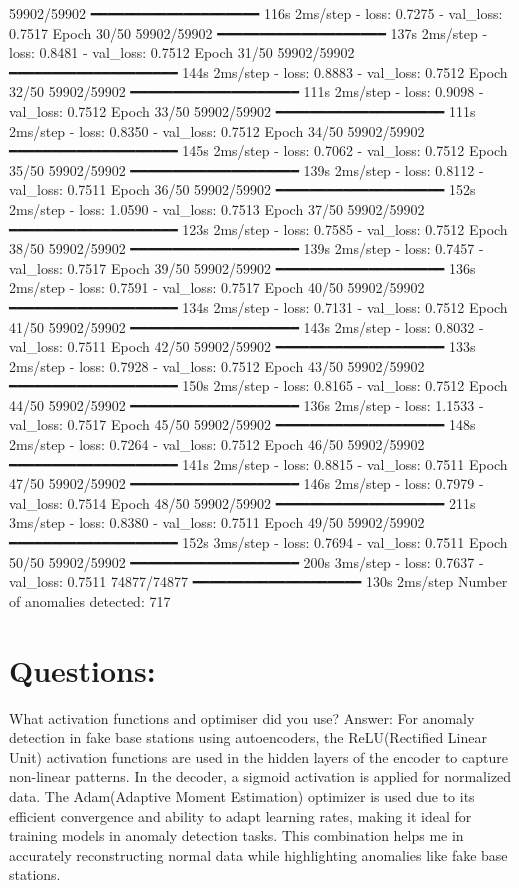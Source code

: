 59902/59902 ━━━━━━━━━━━━━━━━━━━━ 116s 2ms/step - loss: 0.7275 - val_loss: 0.7517
Epoch 30/50
59902/59902 ━━━━━━━━━━━━━━━━━━━━ 137s 2ms/step - loss: 0.8481 - val_loss: 0.7512
Epoch 31/50
59902/59902 ━━━━━━━━━━━━━━━━━━━━ 144s 2ms/step - loss: 0.8883 - val_loss: 0.7512
Epoch 32/50
59902/59902 ━━━━━━━━━━━━━━━━━━━━ 111s 2ms/step - loss: 0.9098 - val_loss: 0.7512
Epoch 33/50
59902/59902 ━━━━━━━━━━━━━━━━━━━━ 111s 2ms/step - loss: 0.8350 - val_loss: 0.7512
Epoch 34/50
59902/59902 ━━━━━━━━━━━━━━━━━━━━ 145s 2ms/step - loss: 0.7062 - val_loss: 0.7512
Epoch 35/50
59902/59902 ━━━━━━━━━━━━━━━━━━━━ 139s 2ms/step - loss: 0.8112 - val_loss: 0.7511
Epoch 36/50
59902/59902 ━━━━━━━━━━━━━━━━━━━━ 152s 2ms/step - loss: 1.0590 - val_loss: 0.7513
Epoch 37/50
59902/59902 ━━━━━━━━━━━━━━━━━━━━ 123s 2ms/step - loss: 0.7585 - val_loss: 0.7512
Epoch 38/50
59902/59902 ━━━━━━━━━━━━━━━━━━━━ 139s 2ms/step - loss: 0.7457 - val_loss: 0.7517
Epoch 39/50
59902/59902 ━━━━━━━━━━━━━━━━━━━━ 136s 2ms/step - loss: 0.7591 - val_loss: 0.7517
Epoch 40/50
59902/59902 ━━━━━━━━━━━━━━━━━━━━ 134s 2ms/step - loss: 0.7131 - val_loss: 0.7512
Epoch 41/50
59902/59902 ━━━━━━━━━━━━━━━━━━━━ 143s 2ms/step - loss: 0.8032 - val_loss: 0.7511
Epoch 42/50
59902/59902 ━━━━━━━━━━━━━━━━━━━━ 133s 2ms/step - loss: 0.7928 - val_loss: 0.7512
Epoch 43/50
59902/59902 ━━━━━━━━━━━━━━━━━━━━ 150s 2ms/step - loss: 0.8165 - val_loss: 0.7512
Epoch 44/50
59902/59902 ━━━━━━━━━━━━━━━━━━━━ 136s 2ms/step - loss: 1.1533 - val_loss: 0.7517
Epoch 45/50
59902/59902 ━━━━━━━━━━━━━━━━━━━━ 148s 2ms/step - loss: 0.7264 - val_loss: 0.7512
Epoch 46/50
59902/59902 ━━━━━━━━━━━━━━━━━━━━ 141s 2ms/step - loss: 0.8815 - val_loss: 0.7511
Epoch 47/50
59902/59902 ━━━━━━━━━━━━━━━━━━━━ 146s 2ms/step - loss: 0.7979 - val_loss: 0.7514
Epoch 48/50
59902/59902 ━━━━━━━━━━━━━━━━━━━━ 211s 3ms/step - loss: 0.8380 - val_loss: 0.7511
Epoch 49/50
59902/59902 ━━━━━━━━━━━━━━━━━━━━ 152s 3ms/step - loss: 0.7694 - val_loss: 0.7511
Epoch 50/50
59902/59902 ━━━━━━━━━━━━━━━━━━━━ 200s 3ms/step - loss: 0.7637 - val_loss: 0.7511
74877/74877 ━━━━━━━━━━━━━━━━━━━━ 130s 2ms/step
Number of anomalies detected: 717

\section*{Questions: }
What activation functions and optimiser did you use?
Answer:
For anomaly detection in fake base stations using autoencoders, the ReLU(Rectified Linear Unit) activation functions are  used in the hidden layers of the encoder to capture non-linear patterns. In the decoder, a sigmoid activation is  applied for normalized data. The Adam(Adaptive Moment Estimation) optimizer is  used due to its efficient convergence and ability to adapt learning rates, making it ideal for training models in anomaly detection tasks. This combination helps me in accurately reconstructing normal data while highlighting anomalies like fake base stations.




